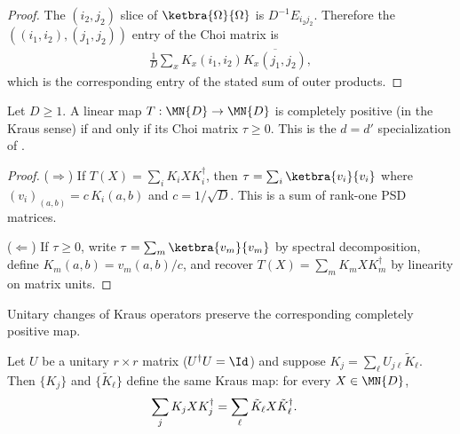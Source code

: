 \begin{proof}\leanok
    The $(i_2,j_2)$ slice of $\ketbra{\Omega}{\Omega}$ is
    $D^{-1}E_{i_2j_2}$. Therefore the
    $((i_1,i_2),(j_1,j_2))$ entry of the Choi matrix is
    \begin{align}
        \frac{1}{D}\sum_x K_x(i_1,i_2)\overline{K_x(j_1,j_2)},
    \end{align}
    which is the corresponding entry of the stated sum of outer products.
\end{proof}

\begin{theorem}\label{thm:cp_iff_choi_posSemidef}
    \leanok
    Let $D\geq1$. A linear map $T : \MN{D} \to \MN{D}$ is completely
    positive (in the Kraus sense) if and only if its Choi matrix $\tau \ge 0$.
    This is the $d=d'$ specialization of
    \cite[Proposition~2.1]{Wolf2012Quantum}.
\end{theorem}

\begin{proof}
    \leanok
    ($\Rightarrow$) If $T(X) = \sum_i K_i X K_i^\dagger$, then
    $\tau = \sum_i \ketbra{v_i}{v_i}$ where
    $(v_i)_{(a,b)} = c\,K_i(a,b)$ and $c = 1/\sqrt{D}$.
    This is a sum of rank-one PSD matrices.

    ($\Leftarrow$) If $\tau \ge 0$, write
    $\tau = \sum_m \ketbra{v_m}{v_m}$
    by spectral decomposition, define $K_m(a,b) = v_m(a,b)/c$,
    and recover $T(X) = \sum_m K_m X K_m^\dagger$ by linearity on
    matrix units.
\end{proof}

Unitary changes of Kraus operators preserve the corresponding completely
positive map.

\begin{theorem}\label{thm:kraus_same_map_of_unitary_combination}
    \leanok
    Let $U$ be a unitary $r \times r$ matrix ($U^\dagger U = \Id$)
    and suppose $K_j = \sum_\ell U_{j\ell} \tilde{K}_\ell$.
    Then $\{K_j\}$ and $\{\tilde{K}_\ell\}$ define the same Kraus map:
    for every $X \in \MN{D}$,
    \begin{align}
        \sum_j K_j X K_j^\dagger
        &= \sum_\ell \tilde{K}_\ell X \tilde{K}_\ell^\dagger.
        \notag
    \end{align}
\end{theorem}

